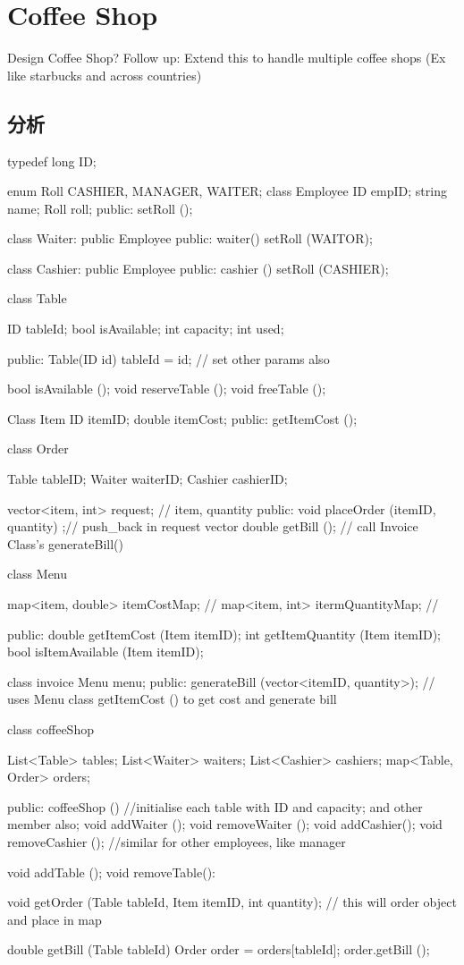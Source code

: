 \section{Coffee Shop}
Design Coffee Shop? Follow up: Extend this to handle multiple coffee shops (Ex like starbucks and across countries)

\subsection{分析}
\begin{Code}
	typedef long ID;
	
	enum Roll {CASHIER, MANAGER, WAITER};
	class Employee{
		ID empID;
		string name;
		Roll roll;
		public:
		setRoll ();
	}
	
	class Waiter: public Employee{
	public:
		waiter() {	setRoll (WAITOR); }
	}
	
	class Cashier: public Employee{
	public:
		cashier () {	setRoll (CASHIER); }
	}
	
	class Table{
		ID tableId;
		bool isAvailable;
		int capacity;
		int used;
		
	public:
		Table(ID id) {tableId = id; // set other params also}
		
		bool isAvailable ();
		void reserveTable ();
		void freeTable ();
	}
	
	Class Item{
		ID itemID;
		double itemCost;
		public:
		getItemCost ();
	}
	
	class Order{
		Table tableID;
		Waiter waiterID;
		Cashier cashierID;
		
		vector<item, int> request; // item, quantity
		public:
		void placeOrder (itemID, quantity) ;// push_back in request vector
		double getBill (); // call Invoice Class's generateBill()
	}
	
	class Menu{
		map<item, double> itemCostMap; //
		map<item, int> itermQuantityMap; //
		
	public:
		double getItemCost (Item itemID);
		int getItemQuantity (Item itemID);
		bool isItemAvailable (Item itemID);
	}
	
	class invoice{
		Menu menu;
	public:
		generateBill (vector<itemID, quantity>); // uses Menu class getItemCost () to get cost and generate bill
	}
	
	
	class coffeeShop{
		List<Table> tables;
		List<Waiter> waiters;
		List<Cashier> cashiers;
		map<Table, Order> orders;
		
	public:
		coffeeShop (){
			//initialise each table with ID and capacity; and other member also;
		}
		void addWaiter ();
		void removeWaiter ();
		void addCashier();
		void removeCashier ();
		//similar for other employees, like manager
		
		void addTable ();
		void removeTable():
		
		void getOrder (Table tableId, Item itemID, int quantity); // this will order object and place in map
		
		double getBill (Table tableId){
			Order order = orders[tableId];
			order.getBill ();
		}
	}
\end{Code}

